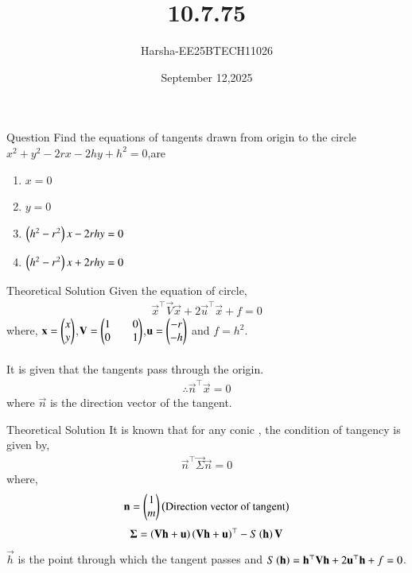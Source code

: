 \documentclass{beamer}
\title %
{10.7.75}
\date{September 12,2025}
\author %
{Harsha-EE25BTECH11026}
\begin{document}
\frame{\titlepage}


\begin{frame}{Question}
Find the equations of tangents drawn from origin to the circle $x^2+y^2-2rx-2hy+h^2=0$,are
\begin{enumerate}
    \item $x=0$
    \item $y=0$
    \item $\left(h^2-r^2\right)x-2rhy=0$
    \item $\left(h^2-r^2\right)x+2rhy=0$
\end{enumerate}
\end{frame}

\begin{frame}{Theoretical Solution}
Given the equation of circle,
\begin{align}
    \vec{x}^{\top}\vec{V}\vec{x}+2\vec{u}^{\top}\vec{x}+f=0 \label{eq:1}
\end{align}
where, $\mathbf{x}=\begin{pmatrix}x\\y\end{pmatrix}$,$\mathbf{V}=\begin{pmatrix}1&&0\\0&&1\end{pmatrix}$,$\mathbf{u}=\begin{pmatrix}-r\\-h\end{pmatrix}$ and $f=h^2$.\\ 
\\
It is given that the tangents pass through the origin.
\begin{align}
    \therefore \vec{n}^{\top}\vec{x}=0 \label{eq:2}
\end{align}
where $\vec{n}$ is the direction vector of the tangent.
\end{frame}

\begin{frame}{Theoretical Solution}
It is known that for any conic , the condition of tangency is given by,
\begin{align}
    \vec{n}^{\top}\vec{\Sigma}\vec{n}=0 \label{eq:3}
\end{align}
where,
\begin{align}
    \mathbf{n}=\begin{pmatrix}1\\m\end{pmatrix}\left(\text{Direction vector of tangent}\right)
\end{align}
\begin{align}
   \mathbf{\Sigma}=\left(\mathbf{V}\mathbf{h}+\mathbf{u}\right)\left(\mathbf{V}\mathbf{h}+\mathbf{u}\right)^{\top}-S\left(\mathbf{h}\right)\mathbf{V} \label{eq:4}
\end{align}
$\vec{h}$ is the point through which the tangent passes and $S\left(\mathbf{h}\right)=\mathbf{h}^{\top}\mathbf{V}\mathbf{h}+2\mathbf{u}^{\top}\mathbf{h}+f=0$.
\end{frame}
\end{document}

